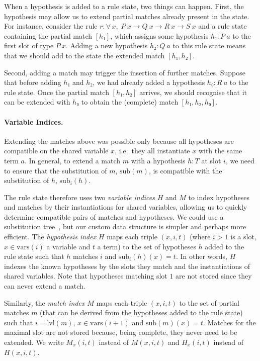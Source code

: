\documentclass[runningheads,leqno]{llncs}
\newcommand{\para}[1]{\paragraph{\bfseries\upshape #1}}
\newcommand{\All}[2]{\ensuremath{\forall\, #1,\; #2}}
\newcommand{\vars}{\ensuremath{\mathrm{vars}}}
\newcommand{\sub}{\ensuremath{\mathrm{sub}}}
\newcommand{\lvl}{\ensuremath{\mathrm{lvl}}}
\begin{document}
When a hypothesis is added to a rule state, two things can happen.
First, the hypothesis may allow us to extend partial matches already present in the state.
For instance, consider the rule $r : \All{x}{P~x → Q~x → R~x → S~x}$ and a rule state containing the partial match $[h₁]$, which assigns some hypothesis $h₁ : P~a$ to the first slot of type $P~x$.
Adding a new hypothesis $h₂ : Q~a$ to this rule state means that we should add to the state the extended match $[h₁, h₂]$.

Second, adding a match may trigger the insertion of further matches.
Suppose that before adding $h₁$ and $h₂$, we had already added a hypothesis $h₀ : R~a$ to the rule state.
Once the partial match $[h₁, h₂]$ arrives, we should recognise that it can be extended with $h₀$ to obtain the (complete) match $[h₁, h₂, h₀]$.

\para{Variable Indices.}
Extending the matches above was possible only because all hypotheses are compatible on the shared variable $x$, i.e.\ they all instantiate $x$ with the same term $a$.
In general, to extend a match $m$ with a hypothesis $h : T$ at slot $i$, we need to ensure that the substitution of $m$, $\sub(m)$, is compatible with the substitution of $h$, $\sub_{i}(h)$.

The rule state therefore uses two \emph{variable indices} $H$ and $M$ to index hypotheses and matches by their instantiations for shared variables, allowing us to quickly determine compatible pairs of matches and hypotheses.
We could use a substitution tree~\cite{SubstitutionTrees}, but our custom data structure is simpler and perhaps more efficient.
The \emph{hypothesis index} $H$ maps each triple $(x, i, t)$ (where $i > 1$ is a slot, $x ∈ \vars(i)$ a variable and $t$ a term) to the set of hypotheses $h$ added to the rule state such that $h$ matches $i$ and $\sub_{i}(h)(x) = t$.
In other words, $H$ indexes the known hypotheses by the slots they match and the instantiations of shared variables.
Note that hypotheses matching slot $1$ are not stored since they can never extend a match.

Similarly, the \emph{match index} $M$ maps each triple $(x, i, t)$ to the set of partial matches $m$ (that can be derived from the hypotheses added to the rule state) such that $i = \lvl(m) $, $x ∈ \vars(i + 1)$ and $\sub(m)(x) = t$.
Matches for the maximal slot are not stored because, being complete, they never need to be extended.
We write $M_{x}(i, t)$ instead of $M(x, i, t)$ and $H_{x}(i, t)$ instead of $H(x, i, t)$.
\end{document}
